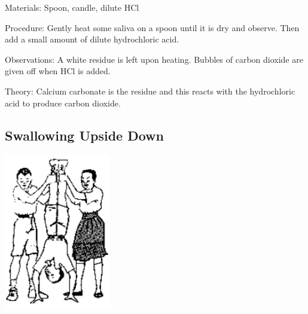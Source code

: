\begin{multicols}{2}
\begin{description*}
\item[Materials:]{Spoon, candle, dilute HCl}
\item[Procedure:]{Gently heat some saliva on a spoon until it is dry and observe. Then add a small amount of dilute hydrochloric acid.}
\item[Observations:]{A white residue is left upon heating. Bubbles of carbon dioxide are given off when HCl is added.}
\item[Theory:]{Calcium carbonate is the residue and this reacts with the hydrochloric acid to produce
carbon dioxide.}
\end{description*}

\subsection{Swallowing Upside Down}  %

\begin{center}
\includegraphics[width=0.35\textwidth]{./img/source/peristalsis.png}
\end{center}


\end{multicols}
